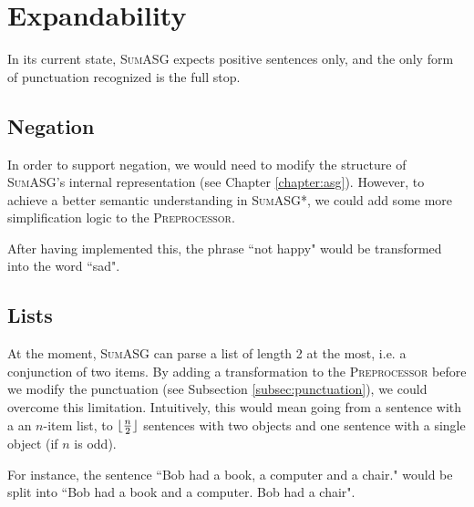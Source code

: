 \section{Expandability}

In its current state, \textsc{SumASG} expects positive sentences only, and the only form of punctuation recognized is the full stop.

\subsection{Negation}

In order to support negation, we would need to modify the structure of \textsc{SumASG}'s internal representation (see Chapter \ref{chapter:asg}). However, to achieve a better semantic understanding in \textsc{SumASG*}, we could add some more simplification logic to the \textsc{Preprocessor}.

After having implemented this, the phrase ``not happy" would be transformed into the word ``sad".

\subsection{Lists}

At the moment, \textsc{SumASG} can parse a list of length 2 at the most, i.e. a conjunction of two items. By adding a transformation to the \textsc{Preprocessor} before we modify the punctuation (see Subsection \ref{subsec:punctuation}), we could overcome this limitation. Intuitively, this would mean going from a sentence with a an $n$-item list, to $\lfloor \frac{n}{2} \rfloor$ sentences with two objects and one sentence with a single object (if $n$ is odd).

For instance, the sentence ``Bob had a book, a computer and a chair." would be split into ``Bob had a book and a computer. Bob had a chair".